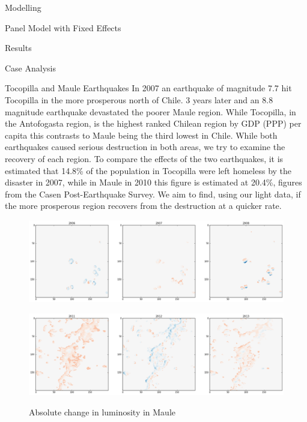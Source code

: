 \documentclass[12.5pt,fleqn,leqno,letterpaper]{article}
\begin{document}
\begin{section}{Modelling}
\begin{subsection}{Panel Model with Fixed Effects}
  \end{subsection}

\end{section}


\begin{section}{Results}

  \begin{subsection}{Case Analysis}

    \begin{subsubsection}{Tocopilla and Maule Earthquakes}
      In 2007 an earthquake of magnitude 7.7 hit Tocopilla in the more prosperous north of Chile. 3 years later and an 8.8 magnitude earthquake devastated the poorer Maule region. While Tocopilla, in the Antofogasta region, is the highest ranked Chilean region by GDP (PPP) per capita this contrasts to Maule being the third lowest in Chile. While both earthquakes caused serious destruction in both areas, we try to examine the recovery of each region. To compare the effects of the two earthquakes, it is estimated that 14.8\% of the population in Tocopilla were left homeless by the disaster in 2007, while in Maule in 2010 this figure is estimated at 20.4\%, figures from the Casen Post-Earthquake Survey. We aim to find, using our light data, if the more prosperous region recovers from the destruction at a quicker rate. \\
      \begin{figure}[H]
        \centering
        \includegraphics[width=1\linewidth]{tocopilla_series}\label{fig:tocopilla_series}
        \caption{Absolute change in luminosity in Tocopilla}
        \includegraphics[width=1\linewidth]{maule_series}\label{fig:maule_series}
        \caption{Absolute change in luminosity in Maule}

\end{figure}
\end{subsubsection}
\end{subsection}
\end{section}
\end{document}
